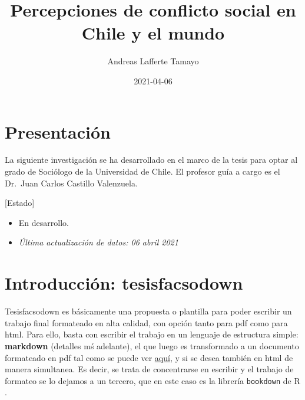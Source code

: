 \documentclass[12pt,twoside]{templates/facsothesis}
\title{Percepciones de conflicto social en Chile y el mundo}
\author{Andreas Lafferte Tamayo}
\date{2021-04-06}
\begin{document}

  \maketitle
\frontmatter %
\pagestyle{empty} %
  \setcounter{tocdepth}{1}
  \setlength{\parskip}{0pt}
  \tableofcontents
\setlength\parskip{1em plus 0.1em minus 0.2em}
  \listoftables
  \listoffigures
\mainmatter %
\pagestyle{fancyplain} %
\hypertarget{presentaciuxf3n}{%
\chapter*{Presentación}\label{presentaciuxf3n}}

La siguiente investigación se ha desarrollado en el marco de la tesis para optar al grado de Sociólogo de la Universidad de Chile. El profesor guía a cargo es el Dr.~Juan Carlos Castillo Valenzuela.

{[}Estado{]}

\begin{itemize}
\item
  En desarrollo.
\item
  \emph{Última actualización de datos: 06 abril 2021}
\end{itemize}

\hypertarget{introducciuxf3n-tesisfacsodown}{%
\chapter{Introducción: tesisfacsodown}\label{introducciuxf3n-tesisfacsodown}}

Tesisfacsodown es básicamente una propuesta o plantilla para poder escribir un trabajo final formateado en alta calidad, con opción tanto para pdf como para html. Para ello, basta con escribir el trabajo en un lenguaje de estructura simple: \textbf{markdown} (detalles mś adelante), el que luego es transformado a un documento formateado en pdf tal como se puede ver \href{docs/tesis.pdf}{aquí}, y si se desea también en html de manera simultanea. Es decir, se trata de concentrarse en escribir y el trabajo de formateo se lo dejamos a un tercero, que en este caso es la librería \texttt{bookdown} de R \citep{xie_Bookdown_2017} .
\end{document}
